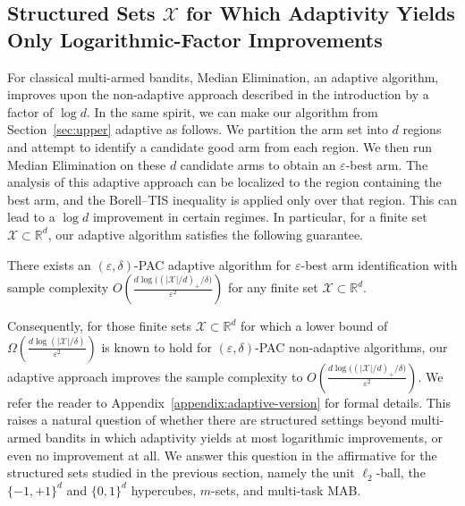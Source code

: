 \subsection{Structured Sets $\mathcal{X}$ for Which Adaptivity Yields Only Logarithmic-Factor Improvements}\label{sec:log-adaptive}
For classical multi-armed bandits, Median Elimination, an adaptive algorithm, improves upon the non-adaptive approach described in the introduction by a factor of $\log d$. In the same spirit, we can make our algorithm from Section~\ref{sec:upper} adaptive as follows. We partition the arm set into $d$ regions and attempt to identify a candidate good arm from each region. We then run Median Elimination on these $d$ candidate arms to obtain an $\varepsilon$-best arm. The analysis of this adaptive approach can be localized to the region containing the best arm, and the Borell--TIS inequality is applied only over that region. This can lead to a $\log d$ improvement in certain regimes. In particular, for a finite set $\mathcal{X}\subset\mathbb{R}^d$, our adaptive algorithm satisfies the following guarantee.
\begin{theorem}\label{thm:median-eliminination-adaptive}
There exists an $(\varepsilon,\delta)$-PAC adaptive algorithm for $\varepsilon$-best arm identification with sample complexity
$O\!\left(\frac{d\log\!\bigl((|\mathcal{X}|/d)_+/\delta\bigr)}{\varepsilon^2}\right)$
for any finite set $\mathcal{X}\subset \mathbb{R}^d$.
\end{theorem}
Consequently, for those finite sets $\mathcal{X}\subset\mathbb{R}^d$ for which a lower bound of $\Omega\!\left(\frac{d\log(|\mathcal{X}|/\delta)}{\varepsilon^2}\right)$ is known to hold for $(\varepsilon,\delta)$-PAC non-adaptive algorithms, our adaptive approach improves the sample complexity to $O\!\left(\frac{d\log\!\bigl((|\mathcal{X}|/d)_+/\delta\bigr)}{\varepsilon^2}\right)$.
We refer the reader to Appendix~\ref{appendix:adaptive-version} for formal details. This raises a natural question of whether there are structured settings beyond multi-armed bandits in which adaptivity yields at most logarithmic improvements, or even no improvement at all. We answer this question in the affirmative for the structured sets studied in the previous section, namely the unit $\ell_2$-ball, the $\{-1,+1\}^d$ and $\{0,1\}^d$ hypercubes, $m$-sets, and multi-task MAB.



